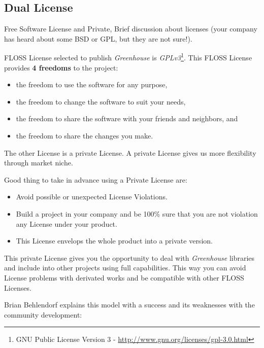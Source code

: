 \documentclass[11pt]{scrartcl}
\begin{document}
\subsection{Dual License}
\label{sub:dual-license}

\par Free Software License and Private, Brief discussion about licenses (your company has heard about some BSD or GPL, but they are not sure!).

\par FLOSS License selected to publish \emph{Greenhouse} is \emph{GPLv3}\footnote{GNU Public License Version 3 - \url{http://www.gnu.org/licenses/gpl-3.0.html}}. This FLOSS License provides \textbf{4 freedoms} to the project:

\begin{itemize}
	\item the freedom to use the software for any purpose,
	\item the freedom to change the software to suit your needs,
	\item the freedom to share the software with your friends and neighbors, and
	\item the freedom to share the changes you make.
\end{itemize}

\par The other License is a private License. A private License gives us more flexibility through market niche.

\par Good thing to take in advance using a Private License are:

\begin{itemize}
	\item Avoid possible or unexpected License Violations.
	\item Build a project in your company and be 100\% sure that you are not violation any License under your product.
	\item This License envelops the whole product into a private version.
\end{itemize}

\par This private License gives you the opportunity to deal with \emph{Greenhouse} libraries and include into other projects using full capabilities. This way you can avoid License problems with derivated works and be compatible with other FLOSS Licenses.

\par Brian Behlendorf\cite{brian-behlendorf-business-strategy} explains this model with a success and its weaknesses with the community development:
\end{document}
